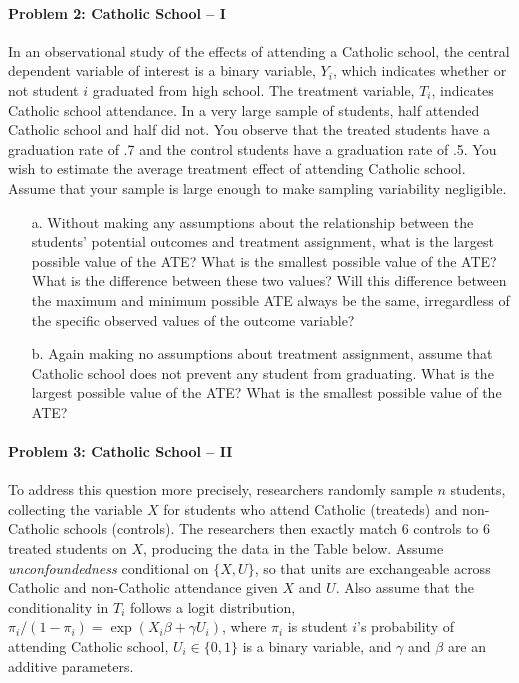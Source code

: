 \documentclass{article}
\begin{document}



\paragraph{Problem 2: Catholic School -- I}  In an observational study of the effects of
attending a Catholic school, the central dependent variable of
interest is a binary variable, $Y_i$, which indicates whether or not
student $i$ graduated from high school. The treatment variable, $T_i$,
indicates Catholic school attendance. In a very large sample of
students, half attended Catholic school and half did not. You observe
that the treated students have a graduation rate of .7 and the control
students have a graduation rate of .5. You wish to estimate the
average treatment effect of attending Catholic school. Assume that
your sample is large enough to make sampling variability negligible.

\begin{itemize}
\item[a.] Without making any assumptions about the relationship between the students’ potential outcomes and treatment assignment, what is the largest possible value of the ATE? What is the smallest possible value of the ATE? What is the difference between these two values? Will this difference between the maximum and minimum possible ATE always be the same, irregardless of the specific observed values of the outcome variable?
\item[b.] Again making no assumptions about treatment assignment, assume that Catholic school does not prevent any student from graduating. What is the largest possible value of the ATE? What is the smallest possible value of the ATE?
\end{itemize}

\paragraph{Problem 3: Catholic School -- II}

To address this question more precisely, researchers randomly sample
$n$ students, collecting the variable $X$ for students who attend
Catholic (treateds) and non-Catholic schools (controls).  The
researchers then exactly match 6 controls to 6 treated students on
$X$, producing the data in the Table below.  Assume {\em
  unconfoundedness} conditional on $\{X,U\}$, so that units are
exchangeable across Catholic and non-Catholic attendance given $X$ and
$U$.  Also assume that the conditionality in $T_i$ follows a logit
distribution, $\pi_i/(1-\pi_i) = \exp(X_i\beta+\gamma U_i)$, where
$\pi_i$ is student $i$'s probability of attending Catholic school,
$U_i \in\{0,1\}$ is a binary variable, and $\gamma$ and $\beta$ are an
additive parameters.
\end{document}

